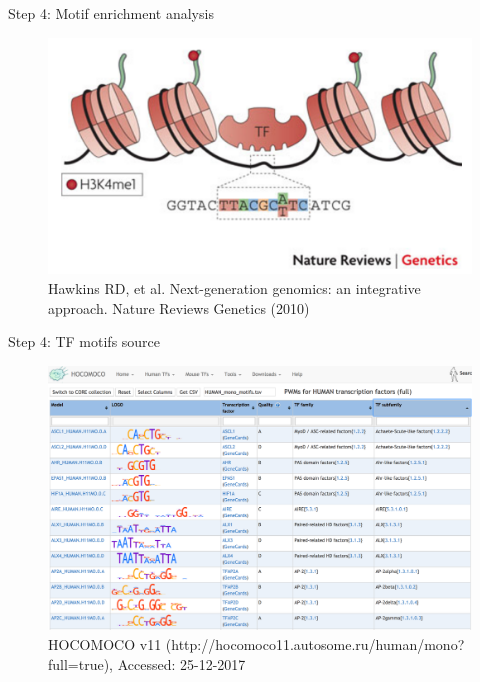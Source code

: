 \documentclass[slidestop,compress,11pt,xcolor=dvipsnames]{beamer}
\begin{document}
\begin{frame}{Step 4: Motif enrichment analysis}

 \vspace*{-0.3cm}
 \begin{figure}
  \centering
  \includegraphics[width=1.0\linewidth]{ELMER/tf_binding.png}{\tiny{\\Hawkins RD, et al. Next-generation genomics: an integrative approach. Nature Reviews Genetics (2010)}}
 \end{figure}
\end{frame}


\begin{frame}{Step 4:  TF motifs source}
 \vspace*{-0.5cm}
 \begin{figure}
 \hspace*{-0.4cm}
  \includegraphics[width=1.1\linewidth]{ELMER/hocomoco.png}{\tiny{\\\vspace{-0.3cm}HOCOMOCO v11 (http://hocomoco11.autosome.ru/human/mono?full=true), Accessed: 25-12-2017}}
 \end{figure}
\end{frame}
\end{document}
